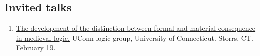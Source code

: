 \subsection{Invited talks}
\begin{enumerate}
	\item {}
	{}
	{
		\href{https://www.youtube.com/watch?v=axBGT-odoW8}{The development of the distinction between formal and material consequence in medieval logic.} UConn logic group, University of Connecticut. Storrs, CT. February 19.}
	{}
	\setcounter{presentationCounter}{\value{enumi}}	%
\end{enumerate}
